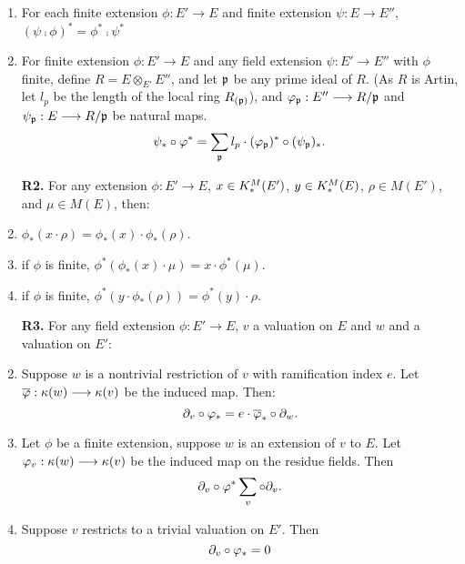 \begin{defn}
\begin{enumerate}[label=\bfseries R1\alph*., leftmargin=3em]
\item For each finite extension $\phi: E' \to E$ and 
finite extension $\psi: E \to E''$, $(\psi \comp \phi)^* = \phi^* 
\comp \psi^*$

\item For finite extension $\phi: E' \to E$ and any 
field extension $\psi: E' \to E''$ with $\phi$ finite, define $R = E 
\otimes_{E'} E''$, and let $\mathfrak{p}$ be any prime ideal of $R$. (As 
$R$ is Artin, let $l_p$ be the length of the local ring 
$R_{(\mathfrak{p})}$), and $\varphi_{\mathfrak{p}}: E'' \longrightarrow R/{\mathfrak{p}}$ 
and $\psi_{\mathfrak{p}}: E \longrightarrow R/{\mathfrak{p}}$ be natural maps.
\[
\psi_*\circ \varphi^* = \sum_{\mathfrak{p}} l_p \cdot 
(\varphi_{\mathfrak{p}})^* \circ (\psi_{\mathfrak{p}})_*.
\]
\end{enumerate}
\begin{enumerate}[label=\bfseries R2\alph*., leftmargin=3em]
\item[\textbf{R2.}] For any extension $\phi: E' \to E$, $x \in 
K^M_*(E')$, $y \in K^M_*(E)$, $\rho \in M(E')$, and $\mu \in 
M(E)$, then:

\item $\phi_*(x \cdot \rho) = \phi_*(x) \cdot 
\phi_*(\rho)$.

\item if $\phi$ is finite, $\phi^*(\phi_*(x) \cdot 
\mu) = x \cdot \phi^*(\mu)$.

\item if $\phi$ is finite, $\phi^*(y \cdot 
\phi_*(\rho)) = \phi^*(y) \cdot \rho$.
\end{enumerate}
\begin{enumerate}[label=\bfseries R3\alph*., leftmargin=3em]
\item[\textbf{R3.}] For any field extension $\phi: E' \to E$, $v$ 
a valuation on $E$ and $w$ and a valuation on $E'$:

\item Suppose $w$ is a nontrivial restriction of 
$v$ with ramification index $e$. Let $\overline{\varphi}: \kappa(w) \longrightarrow 
\kappa(v)$ be the induced map. Then:
\[
\partial_{v} \circ \varphi_* = e \cdot \overline{\varphi}_* \circ \partial_{w}.
\]

\item Let $\phi$ be a finite extension, suppose
$w$ is an extension of $v$ to $E$. Let $\varphi_v: \kappa(w) \longrightarrow 
\kappa(v)$ be the induced map on the residue fields. Then
\[
\partial_{v} \circ \varphi^* \sum_{v} \circ \partial_{v}.
\]

\item Suppose $v$ restricts to a trivial valuation 
on $E'$. Then
\[
\partial_{v} \circ \varphi_* = 0
\]


\end{enumerate}
\end{defn}
